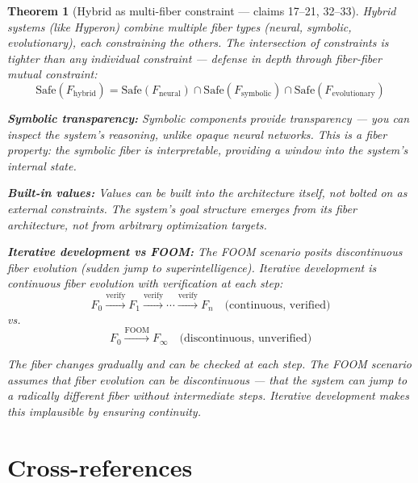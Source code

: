 \documentclass[11pt,a4paper]{article}
\newtheorem{theorem}[definition]{Theorem}
\begin{document}
\begin{theorem}[Hybrid as multi-fiber constraint --- claims 17--21, 32--33]
\label{thm:hybrid}
Hybrid systems (like Hyperon) combine multiple fiber types (neural,
symbolic, evolutionary), each constraining the others. The intersection
of constraints is tighter than any individual constraint --- defense in
depth through fiber-fiber mutual constraint:
\[
  \text{Safe}(F_{\text{hybrid}}) = \text{Safe}(F_{\text{neural}})
  \cap \text{Safe}(F_{\text{symbolic}})
  \cap \text{Safe}(F_{\text{evolutionary}})
\]

\textbf{Symbolic transparency:} Symbolic components provide transparency
--- you can inspect the system's reasoning, unlike opaque neural networks.
This is a fiber property: the symbolic fiber is interpretable, providing
a window into the system's internal state.

\textbf{Built-in values:} Values can be built into the architecture itself,
not bolted on as external constraints. The system's goal structure emerges
from its fiber architecture, not from arbitrary optimization targets.

\textbf{Iterative development vs FOOM:} The FOOM scenario posits
\emph{discontinuous} fiber evolution (sudden jump to superintelligence).
Iterative development is \emph{continuous} fiber evolution with
verification at each step:
\[
  F_0 \xrightarrow{\text{verify}} F_1 \xrightarrow{\text{verify}}
  \cdots \xrightarrow{\text{verify}} F_n
  \quad \text{(continuous, verified)}
\]
vs.
\[
  F_0 \xrightarrow{\text{FOOM}} F_\infty
  \quad \text{(discontinuous, unverified)}
\]

The fiber changes gradually and can be checked at each step. The FOOM
scenario assumes that fiber evolution can be discontinuous --- that the
system can jump to a radically different fiber without intermediate steps.
Iterative development makes this implausible by ensuring continuity.
\end{theorem}

\section{Cross-references}
\end{document}
